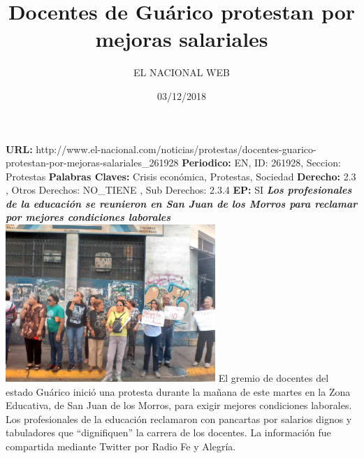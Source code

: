 \documentclass{article}%
\title{\textbf{Docentes de Guárico protestan por mejoras salariales}}%
\author{EL NACIONAL WEB}%
\date{03/12/2018}%
\begin{document}
%
\normalsize%
\maketitle%
\textbf{URL: }%
http://www.el{-}nacional.com/noticias/protestas/docentes{-}guarico{-}protestan{-}por{-}mejoras{-}salariales\_261928\newline%
%
\textbf{Periodico: }%
EN, %
ID: %
261928, %
Seccion: %
Protestas\newline%
%
\textbf{Palabras Claves: }%
Crisis económica, Protestas, Sociedad\newline%
%
\textbf{Derecho: }%
2.3%
, Otros Derechos: %
NO\_TIENE%
, Sub Derechos: %
2.3.4%
\newline%
%
\textbf{EP: }%
SI\newline%
\newline%
%
\textbf{\textit{Los profesionales de la educación se reunieron en San Juan de los Morros para reclamar por mejores condiciones laborales~}}%
\newline%
\newline%
%
\includegraphics[width=300px]{55.jpg}%
\newline%
%
El gremio de docentes del estado Guárico inició una protesta durante la mañana de este martes en la Zona Educativa, de San Juan de los Morros, para exigir mejores condiciones laborales.%
\newline%
%
Los profesionales de la educación reclamaron con pancartas por salarios dignos y tabuladores que “dignifiquen” la carrera de los docentes.%
\newline%
%
La información fue compartida mediante Twitter por Radio Fe y Alegría.%
\newline%
%
\end{document}

